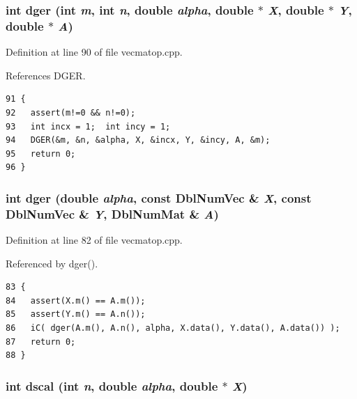 \subsubsection{\setlength{\rightskip}{0pt plus 5cm}int dger (int {\em m}, int {\em n}, double {\em alpha}, double $\ast$ {\em X}, double $\ast$ {\em Y}, double $\ast$ {\em A})}\label{vecmatop_8cpp_f8ede744e4705c3d338ad70b5b4f5eef_f8ede744e4705c3d338ad70b5b4f5eef}




Definition at line 90 of file vecmatop.cpp.

References DGER.

\footnotesize\begin{verbatim}91 {
92   assert(m!=0 && n!=0);
93   int incx = 1;  int incy = 1;
94   DGER(&m, &n, &alpha, X, &incx, Y, &incy, A, &m);
95   return 0;
96 }
\end{verbatim}\normalsize 


\subsubsection{\setlength{\rightskip}{0pt plus 5cm}int dger (double {\em alpha}, const {\bf Dbl\-Num\-Vec} \& {\em X}, const {\bf Dbl\-Num\-Vec} \& {\em Y}, {\bf Dbl\-Num\-Mat} \& {\em A})}\label{vecmatop_8cpp_a7e716e5ac5169dc959018df48f6aafa_a7e716e5ac5169dc959018df48f6aafa}




Definition at line 82 of file vecmatop.cpp.

Referenced by dger().

\footnotesize\begin{verbatim}83 {
84   assert(X.m() == A.m());
85   assert(Y.m() == A.n());
86   iC( dger(A.m(), A.n(), alpha, X.data(), Y.data(), A.data()) );
87   return 0;
88 }
\end{verbatim}\normalsize 


\subsubsection{\setlength{\rightskip}{0pt plus 5cm}int dscal (int {\em n}, double {\em alpha}, double $\ast$ {\em X})}\label{vecmatop_8cpp_7358d64948ad9a47cf0744506e881c1d_7358d64948ad9a47cf0744506e881c1d}




